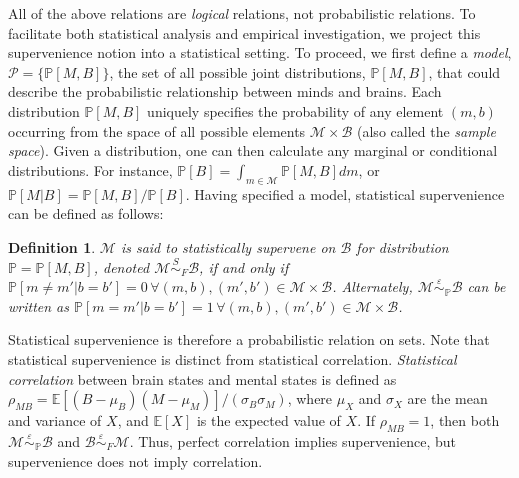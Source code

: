 \documentclass{article}
\newcommand{\mB}{\mathcal{B}}
\newcommand{\mM}{\mathcal{M}}
\newcommand{\PP}{\mathbb{P}}           %
\newcommand{\EE}{\mathbb{E}}           %
\newcommand{\sig}{\sigma}
\providecommand{\mc}[1]{\mathcal{#1}}
\newcommand{\MeB}{\mM \overset{\varepsilon}{{\sim}}_{\PP} \mB}
\newtheorem{defi}{Definition}
\begin{document}
All of the above relations are \emph{logical} relations, not probabilistic relations. To facilitate both statistical analysis and empirical investigation, we project this supervenience notion into a statistical setting.  To proceed, we first define a \emph{model}, $\mc{P}=\{\PP[M,B]\}$, the set of all possible joint distributions, $\PP[M,B]$, that could describe the probabilistic relationship between minds and brains.  Each distribution $\PP[M,B]$ uniquely specifies the probability of any element $(m,b)$ occurring from the space of all possible elements $\mc{M} \times \mc{B}$ (also called the \emph{sample space}).%
Given a distribution, one can then calculate any marginal or conditional distributions.  For instance, $\PP[B]=\int_{m \in \mM} \PP[M,B]dm$, or $\PP[M|B]=\PP[M,B]/\PP[B]$.  Having specified a model, statistical supervenience can be defined as follows:
\begin{defi}
\label{def1} 
$\mM$ is said to \textit{statistically supervene} on $\mB$ for distribution $\PP=\PP[M,B]$, denoted $\mM \overset{S}{\sim}_F \mB$, if and only if $\PP[m \neq m' | b=b']=0 \, \forall (m,b), (m',b') \in \mc{M} \times \mc{B}$. Alternately, $\MeB$ can be written as $\PP[m = m' | b = b']=1  \, \forall (m,b), (m',b') \in \mc{M} \times \mc{B}$.
\end{defi}
Statistical supervenience is therefore a probabilistic relation on sets.  Note that statistical supervenience is distinct from statistical correlation.  \emph{Statistical correlation} between brain states and mental states is defined as $\rho_{MB}=\EE[(B-\mu_B)(M-\mu_M)]/(\sig_B \sig_M)$, where $\mu_X$ and $\sig_X$ are the mean and variance of $X$, and $\EE[X]$ is the expected value of $X$.  If $\rho_{MB}=1$, then both $\MeB$ and $\mB \overset{\varepsilon}{{\sim}}_F \mM$. Thus, perfect correlation implies supervenience, but supervenience does not imply correlation.  
\end{document}
